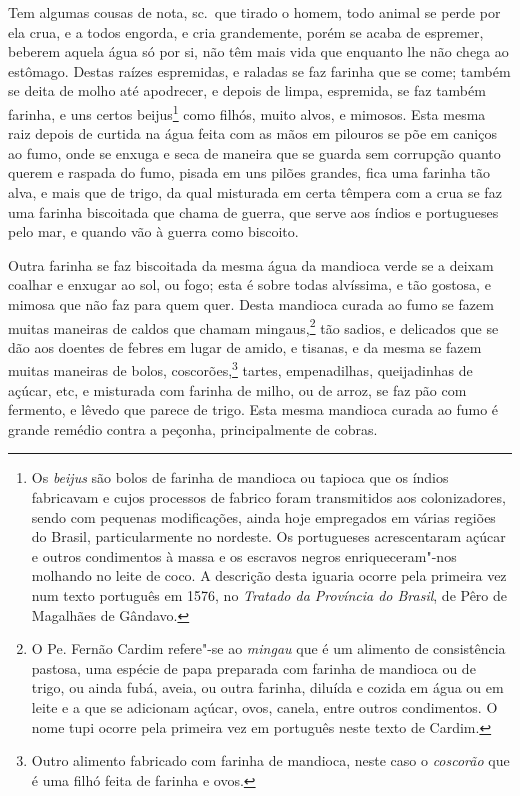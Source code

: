 \begin{linenumbers}
 Tem algumas cousas de nota, sc.~que tirado o homem, todo animal se
perde por ela crua, e a todos engorda, e cria grandemente, porém se
acaba de espremer, beberem aquela água só por si, não têm mais vida que
enquanto lhe não chega ao estômago. Destas raízes espremidas, e raladas
se faz farinha que se come; também se deita de molho até apodrecer, e
depois de limpa, espremida, se faz também farinha, e uns certos 
beijus\footnote{ Os \textit{beijus} são bolos de farinha de mandioca ou
tapioca que os índios fabricavam e cujos processos de fabrico foram
transmitidos aos colonizadores, sendo com pequenas modificações, ainda
hoje empregados em várias regiões do Brasil, particularmente no
nordeste. Os portugueses acrescentaram açúcar e outros condimentos à
massa e os escravos negros enriqueceram"-nos molhando no leite de coco.
A descrição desta iguaria ocorre pela primeira vez num texto português
em 1576, no \textit{Tratado da Província do Brasil}, de Pêro de Magalhães de 
Gândavo.} como filhós, muito alvos, e mimosos. Esta mesma raiz depois
de curtida na água feita com as mãos em pilouros se põe em caniços ao
fumo, onde se enxuga e seca de maneira que se guarda sem corrupção
quanto querem e raspada do fumo, pisada em uns pilões grandes, fica uma
farinha tão alva, e mais que de trigo, da qual misturada em certa
têmpera com a crua se faz uma farinha biscoitada que chama de guerra,
que serve aos índios e portugueses pelo mar, e quando vão à guerra como biscoito. 

 Outra farinha se faz biscoitada da mesma água da mandioca verde se a 
deixam coalhar e enxugar ao sol, ou fogo; esta é sobre todas alvíssima,
e tão gostosa, e mimosa que não faz para quem quer. Desta mandioca
curada ao fumo se fazem muitas maneiras de caldos que chamam
mingaus,\footnote{ O Pe. Fernão Cardim refere"-se ao \textit{mingau} que
é um alimento de consistência pastosa, uma espécie de papa preparada
com farinha de mandioca ou de trigo, ou ainda fubá, aveia, ou outra
farinha, diluída e cozida em água ou em leite e a que se adicionam
açúcar, ovos, canela, entre outros condimentos. O nome tupi ocorre pela
primeira vez em português neste texto de Cardim.} tão sadios, e
delicados que se dão aos doentes de febres em lugar de amido, e
tisanas, e da mesma se fazem muitas maneiras de bolos, 
coscorões,\footnote{ Outro alimento fabricado com farinha de mandioca, neste caso
o \textit{coscorão} que é uma filhó feita de farinha e ovos.} tartes,
empenadilhas, queijadinhas de açúcar, etc, e misturada com farinha de
milho, ou de arroz, se faz pão com fermento, e lêvedo que parece de
trigo. Esta mesma mandioca curada ao fumo é grande remédio contra a
peçonha, principalmente de cobras. 


\end{linenumbers}
